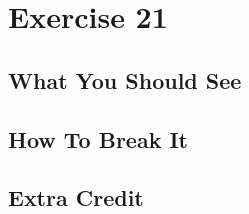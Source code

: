 \chapter{Exercise 21}


\section{What You Should See}


\section{How To Break It}


\section{Extra Credit}




